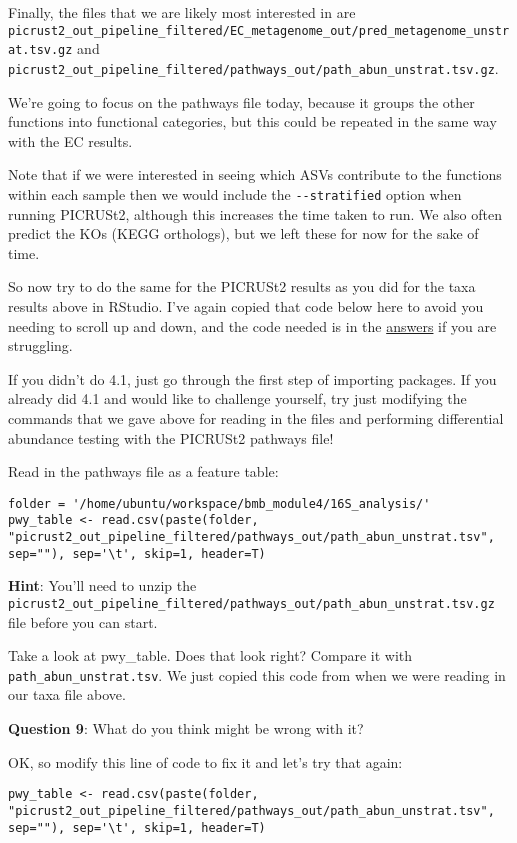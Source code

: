 \documentclass[
]{book}
\begin{document}
Finally, the files that we are likely most interested in are \texttt{picrust2\_out\_pipeline\_filtered/EC\_metagenome\_out/pred\_metagenome\_unstrat.tsv.gz} and \texttt{picrust2\_out\_pipeline\_filtered/pathways\_out/path\_abun\_unstrat.tsv.gz}.

We're going to focus on the pathways file today, because it groups the other functions into functional categories, but this could be repeated in the same way with the EC results.

Note that if we were interested in seeing which ASVs contribute to the functions within each sample then we would include the \texttt{-\/-stratified} option when running PICRUSt2, although this increases the time taken to run. We also often predict the KOs (KEGG orthologs), but we left these for now for the sake of time.

So now try to do the same for the PICRUSt2 results as you did for the taxa results above in RStudio. I've again copied that code below here to avoid you needing to scroll up and down, and the code needed is in the \hyperref[answers]{answers} if you are struggling.

If you didn't do 4.1, just go through the first step of importing packages. If you already did 4.1 and would like to challenge yourself, try just modifying the commands that we gave above for reading in the files and performing differential abundance testing with the PICRUSt2 pathways file!

Read in the pathways file as a feature table:

\begin{verbatim}
folder = '/home/ubuntu/workspace/bmb_module4/16S_analysis/'
pwy_table <- read.csv(paste(folder, "picrust2_out_pipeline_filtered/pathways_out/path_abun_unstrat.tsv", sep=""), sep='\t', skip=1, header=T)
\end{verbatim}

\textbf{Hint}: You'll need to unzip the \texttt{picrust2\_out\_pipeline\_filtered/pathways\_out/path\_abun\_unstrat.tsv.gz} file before you can start.

Take a look at pwy\_table. Does that look right? Compare it with \texttt{path\_abun\_unstrat.tsv}. We just copied this code from when we were reading in our taxa file above.

\textbf{Question 9}: What do you think might be wrong with it?

OK, so modify this line of code to fix it and let's try that again:

\begin{verbatim}
pwy_table <- read.csv(paste(folder, "picrust2_out_pipeline_filtered/pathways_out/path_abun_unstrat.tsv", sep=""), sep='\t', skip=1, header=T)
\end{verbatim}
\end{document}
